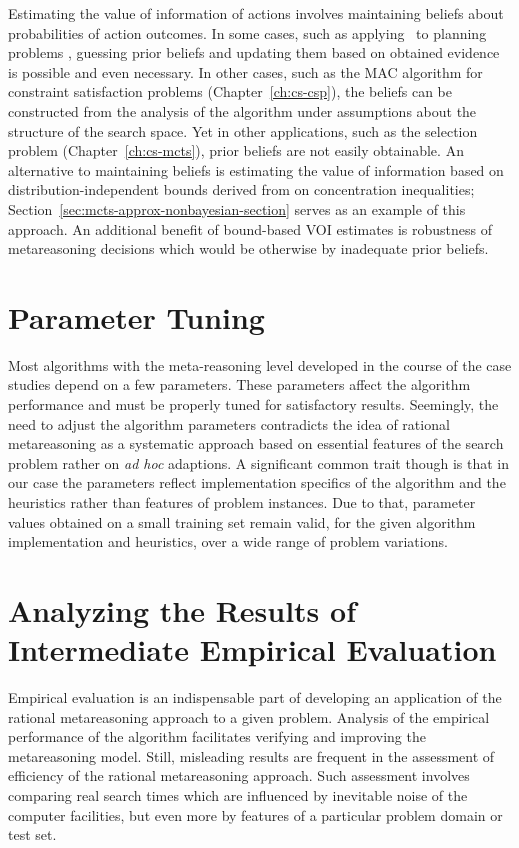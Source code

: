 Estimating the value of information of actions involves maintaining
beliefs about probabilities of action outcomes. In some cases, such as
applying \rationallazyastar~to planning problems
\cite{TolpinEtAl.rla}, guessing prior beliefs and updating them based
on obtained evidence is possible and even necessary. In other cases,
such as the MAC algorithm for constraint satisfaction problems
(Chapter~\ref{ch:cs-csp}), the beliefs can be constructed from the
analysis of the algorithm under assumptions about the structure of the
search space. Yet in other applications, such as the selection problem
(Chapter~\ref{ch:cs-mcts}), prior beliefs are not easily obtainable. An
alternative to maintaining beliefs is estimating the value of
information based on distribution-independent bounds derived from on
concentration inequalities;
Section~\ref{sec:mcts-approx-nonbayesian-section} serves as an example  
of this approach. An additional benefit of bound-based VOI estimates 
is robustness of metareasoning decisions which would be otherwise
by inadequate prior beliefs. 

\section{Parameter Tuning}

Most algorithms with the meta-reasoning level developed in the course
of the case studies depend on a few parameters. These parameters
affect the algorithm performance and must be properly tuned for
satisfactory results. Seemingly, the need to adjust the algorithm
parameters contradicts the idea of rational metareasoning as a
systematic approach based on essential features of the search problem
rather on \textit{ad hoc} adaptions. A significant common trait though
is that in our case the parameters reflect implementation specifics
of the algorithm and the heuristics rather than features of problem
instances. Due to that, parameter values obtained on a small training
set remain valid, for the given algorithm implementation and
heuristics, over a wide range of problem variations. 

\section{Analyzing the Results of Intermediate Empirical Evaluation}

Empirical evaluation is an indispensable part of developing an
application of the rational metareasoning approach to a given
problem. Analysis of the empirical performance of the algorithm
facilitates verifying and improving the metareasoning model.  Still,
misleading results are frequent in the assessment of efficiency of the
rational metareasoning approach. Such assessment involves comparing
real search times which are influenced by inevitable noise of the
computer facilities, but even more by features of a particular problem
domain or test set. 

